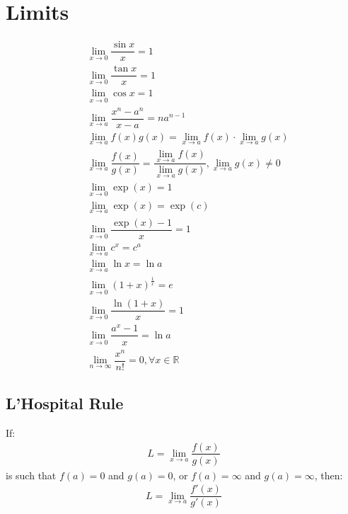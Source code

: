 \documentclass[../main.tex]{subfile}
\begin{document}
    \chapter{Limits}
    \begin{align}
            & \lim_{x \to 0} \dfrac{\sin x}{x} = 1\\
            & \lim_{x \to 0} \dfrac{\tan x}{x} = 1\\
            &\lim_{x\to0} \cos x = 1\\
            & \lim_{x \to a} \dfrac{x^n - a^n}{x - a} = na^{n - 1}\\
            & \lim_{x \to a} f(x) g(x) = \lim_{x \to a} f(x) \cdot \lim_{x \to a} g(x)\\
            & \lim_{x \to a} \dfrac{f(x)}{g(x)} = \dfrac{\lim_{x \to a} f(x)} {\lim_{x \to a} g(x)}, \lim_{x \to a} g(x) \neq 0\\
            & \lim_{x \to 0} \exp(x) = 1\\
            & \lim_{x \to a} \exp(x) = \exp(c)\\
            & \lim_{x \to 0} \dfrac{\exp(x) - 1}{x} = 1\\
            & \lim_{x \to a} c^x = c^a\\
            & \lim_{x \to a} \ln x = \ln a\\
            & \lim_{x \to 0} (1 + x)^{\frac{1}{x}} = e\\
            & \lim_{x \to 0} \dfrac{\ln (1 + x)}{x} = 1\\
            & \lim_{x \to 0} \dfrac{a^x - 1}{x} = \ln a\\
            & \lim_{n \to \infty} \dfrac{x^n}{n!} = 0, \forall x \in \mathbb{R}
        \end{align}
        
        \section{L'Hospital Rule}
        If:
        \begin{align}
            L = \lim_{x \to a} \dfrac{f(x)}{g(x)} \nonumber
        \end{align}
        is such that $f(a) = 0$ and $g(a) = 0$, or $f(a) = \infty$ and $g(a) = \infty$, then:
        \begin{align}
            L = \lim_{x \to a} \dfrac{f'(x)}{g'(x)} \nonumber
        \end{align}
\end{document}

